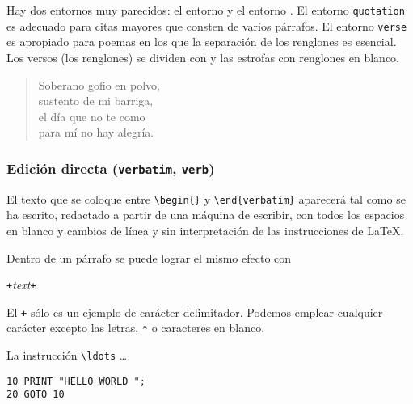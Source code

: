 Hay dos entornos muy parecidos: el entorno  y el entorno
.  El  entorno  \texttt{quotation} es  adecuado  para  citas
mayores que consten  de varios párrafos. El  entorno \texttt{verse} es
apropiado para  poemas en los  que la  separación de los  renglones es
esencial. Los  versos (los  renglones) se dividen  con \ci{\bs}  y las
estrofas con renglones en blanco.



\begin{example}
\begin{flushleft}
\begin{verse}
Soberano gofio en polvo,\\
sustento de mi barriga,\\
el día que no te como\\
para mí no hay alegría.
\end{verse}
\end{flushleft}
\end{example}

\subsubsection{Edición directa (\texttt{verbatim}, \texttt{verb})}

El texto  que se  coloque entre  \verb|\begin{|\verb|}| y
\verb|\end{verbatim}| aparecerá  tal como  se ha escrito,  redactado a
partir de una máquina de escribir,  con todos los espacios en blanco y
cambios de línea y sin interpretación de las instrucciones de \LaTeX.

Dentro de un párrafo se puede lograr el mismo efecto con

\begin{command}
\verb|+|\emph{text}\verb|+|
\end{command}

\noindent  El \verb|+|  sólo es  un ejemplo  de carácter  delimitador.
Podemos  emplear cualquier  carácter  excepto las  letras, \verb|*|  o
caracteres en blanco.

\begin{example}
La instrucción \verb|\ldots|%
\ldots

\begin{verbatim}
10 PRINT "HELLO WORLD ";
20 GOTO 10
\end{verbatim}
\end{example}

